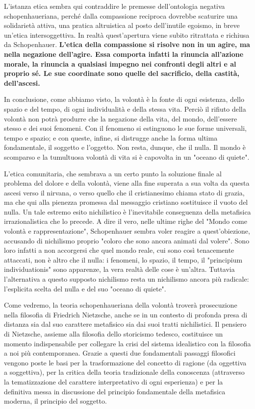 L’istanza etica sembra qui contraddire le premesse dell’ontologia negativa schopenhaueriana, perché dalla compassione reciproca dovrebbe scaturire una solidarietà attiva, una pratica altruistica al posto dell’inutile egoismo, in breve un’etica intersoggettiva. In realtà quest’apertura viene subito ritrattata e richiusa da Schopenhauer. \textbf{L’etica della compassione si risolve non in un agire, ma nella negazione dell’agire. Essa comporta infatti la rinuncia all’azione morale, la rinuncia a qualsiasi impegno nei confronti degli altri e al proprio sé. Le sue coordinate sono quelle del sacrificio, della castità, dell’ascesi.} 

In conclusione, come abbiamo visto, la volontà è la fonte di ogni esistenza, dello spazio e del tempo, di ogni individualità e della stessa vita. Perciò il rifiuto della volontà non potrà produrre che la negazione della vita, del mondo, dell’essere stesso e dei suoi fenomeni. Con il fenomeno si estinguono le sue forme universali, tempo e spazio; e con queste, infine, si distrugge anche la forma ultima fondamentale, il soggetto e l’oggetto. Non resta, dunque, che il nulla. Il mondo è scomparso e la tumultuosa volontà di vita si è capovolta in un "oceano di quiete".

 L’etica comunitaria, che sembrava a un certo punto la soluzione finale al problema del dolore e della volontà, viene alla fine superata a sua volta da questa ascesi verso il nirvana, o verso quello che il cristianesimo chiama stato di grazia, ma che qui alla pienezza promessa dal messaggio cristiano sostituisce il vuoto del nulla. Un tale estremo esito nichilistico è l’inevitabile conseguenza della metafisica irrazionalistica che lo precede. A dire il vero, nelle ultime righe del "Mondo come volontà e rappresentazione", Schopenhauer sembra voler reagire a quest’obiezione, accusando di nichilismo proprio "coloro che sono ancora animati dal volere". Sono loro infatti a non accorgersi che quel mondo reale, cui sono così tenacemente attaccati, non è altro che il nulla: i fenomeni, lo spazio, il tempo, il "principium individuationis" sono apparenze, la vera realtà delle cose è un’altra. Tuttavia l’alternativa a questo supposto nichilismo resta un nichilismo ancora più radicale: l’esplicita scelta del nulla e del suo "oceano di quiete". 
 
 Come vedremo, la teoria schopenhaueriana della volontà troverà prosecuzione nella filosofia di Friedrich Nietzsche, anche se in un contesto di profonda presa di distanza sia dal suo carattere metafisico sia dai suoi tratti nichilistici. Il pensiero di Nietzsche, assieme alla filosofia dello storicismo tedesco, costituisce un momento indispensabile per collegare la crisi del sistema idealistico con la filosofia a noi più contemporanea. Grazie a questi due fondamentali passaggi filosofici vengono poste le basi per la trasformazione del concetto di ragione (da oggettiva a soggettiva), per la critica della teoria tradizionale della conoscenza (attraverso la tematizzazione del carattere interpretativo di ogni esperienza) e per la definitiva messa in discussione del principio fondamentale della metafisica moderna, il principio del soggetto.